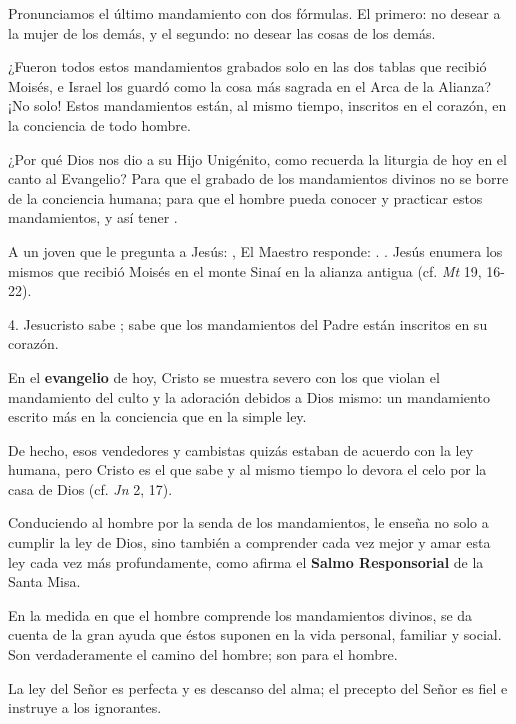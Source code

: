 \begin{body}
Pronunciamos el último mandamiento con dos fórmulas. El primero: no desear a la mujer de los demás, y el segundo: no desear las cosas de los demás.

¿Fueron todos estos mandamientos grabados solo en las dos tablas que recibió Moisés, e Israel los guardó como la cosa más sagrada en el Arca de la Alianza? ¡No solo! Estos mandamientos están, al mismo tiempo, inscritos en el corazón, en la conciencia de todo hombre.

¿Por qué Dios nos dio a su Hijo Unigénito, como recuerda la liturgia de hoy en el canto al Evangelio? Para que el grabado de los mandamientos divinos no se borre de la conciencia humana; para que el hombre pueda conocer y practicar estos mandamientos, y así tener .

A un joven que le pregunta a Jesús: , El Maestro responde: . . Jesús enumera los mismos que recibió Moisés en el monte Sinaí en la alianza antigua (cf. \textit{Mt} 19, 16-22).

4. Jesucristo sabe ; sabe que los mandamientos del Padre están inscritos en su corazón.

En el \textbf{evangelio} de hoy, Cristo se muestra severo con los que violan el mandamiento del culto y la adoración debidos a Dios mismo: un mandamiento escrito más en la conciencia que en la simple ley.

De hecho, esos vendedores y cambistas quizás estaban de acuerdo con la ley humana, pero Cristo es el que sabe  y al mismo tiempo lo devora el celo por la casa de Dios (cf. \textit{Jn} 2, 17).

Conduciendo al hombre por la senda de los mandamientos, le enseña no solo a cumplir la ley de Dios, sino también a comprender cada vez mejor y amar esta ley cada vez más profundamente, como afirma el \textbf{Salmo Responsorial} de la Santa Misa.

En la medida en que el hombre comprende los mandamientos divinos, se da cuenta de la gran ayuda que éstos suponen en la vida personal, familiar y social. Son verdaderamente el camino del hombre; son para el hombre.

\begin{bodyprose}
La ley del Señor es perfecta
   y es descanso del alma;
   el precepto del Señor es fiel
   e instruye a los ignorantes.


\end{bodyprose}
\end{body}
